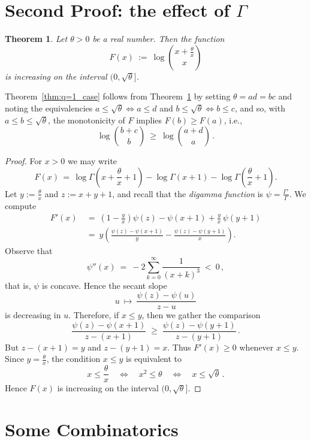 \documentclass[11pt]{amsart}
\newtheorem{theorem}{Theorem} %
\begin{document}

\section{Second Proof: the effect of $\Gamma$}

\begin{theorem} \label{q=1_thr_gamma}
Let $\theta > 0$ be a real number. Then the function
$$F(x) \ := \ \log \!\binom{x+\frac \theta x}{x}$$
is increasing on the interval $(0,\sqrt{\theta}]$.
\end{theorem}


Theorem~\ref{thm:q=1_case} follows from Theorem~\ref{q=1_thr_gamma} by setting $\theta = ad = bc$ and noting the equivalencies 
$a\leq \sqrt{\theta} \iff a\leq d$ and
$b\leq \sqrt{\theta} \iff b\leq c$,
and so, with $a \le b \leq \sqrt{\theta}$, the monotonicity of $F$ implies $F(b)\geq F(a)$, i.e., 
$$   \log \!\binom{b + c}{b}  \ \ge \ \log \!\binom{a + d}{a} \, .$$

\begin{proof} 
For $x>0$ we may write
$$F(x) \, = \,  \log \Gamma\!\left(x+\frac{\theta}{x}+1\right) - \log \Gamma(x+1)- \log \Gamma\!\left(\frac{\theta}{x}+1\right).$$
Let $y := \frac{\theta}{x}$ and $z := x + y + 1$, and recall that the \emph{digamma function} is $\psi = \frac{\Gamma'}{\Gamma}$.  
We compute 
\begin{align*}
F'(x) \ &= \ \left(1-\frac{y}{x}\right)\psi(z) - \psi(x+1)  + \frac{y}{x}\,\psi(y+1) \\
\ &= \ y \left(\frac{\psi(z) - \psi(x+1)}{y}  - \frac{\psi(z) - \psi(y+1)}{x} \right).
\end{align*}
Observe that
$$\psi''(x) \ = \ -2\sum_{k=0}^{\infty} \frac{1}{(x+k)^3} \ < \ 0 \, ,$$
that is, $\psi$ is concave. Hence the secant slope
$$ u \ \mapsto\ \frac{\psi(z)-\psi(u)}{z-u}$$
is decreasing in $u$. Therefore, if $x \le y$, then we gather the comparison
$$\frac{\psi(z)-\psi(x+1)}{z-(x+1)}   \;\ge\;  \frac{\psi(z)-\psi(y+1)}{z-(y+1)} \, .$$
But $z-(x+1) = y$ and $z-(y+1) = x$. Thus $F'(x)\ge 0$ whenever $x \le y$.  
Since $y=\frac \theta x$, the condition $x\le y$ is equivalent to
$$ x \le \frac{\theta}{x} \quad\Longleftrightarrow\quad   x^2 \le \theta \quad\Longleftrightarrow\quad
x\leq\sqrt{\theta} \, . $$
Hence $F(x)$ is increasing on the interval $(0,\sqrt{\theta}]$.
\end{proof}


\section{Some Combinatorics}\label{sec:combin1}
\end{document}
